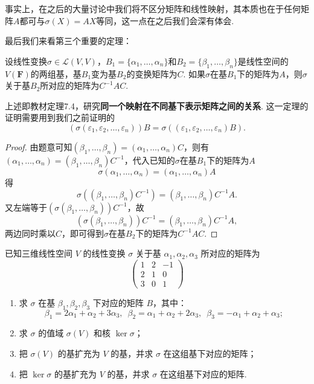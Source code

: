 事实上，在之后的大量讨论中我们将不区分矩阵和线性映射，其本质也在于任何矩阵$A$都可与$\sigma(X)=AX$等同，这一点在之后我们会深有体会.

最后我们来看第三个重要的定理：
\begin{theorem}[基的选择对映射矩阵的影响] \label{thm:11:基的选择对映射矩阵的影响}
    设线性变换$\sigma \in \mathcal{L}(V,V)$，$B_1=\{\alpha_1,\ldots,\alpha_n\}$和$B_2=\{\beta_1,\ldots,\beta_n\}$是线性空间的$V(\mathbf{F})$的两组基，基$B_1$变为基$B_2$的变换矩阵为$C$. 如果$\sigma$在基$B_1$下的矩阵为$A$，则$\sigma$关于基$B_2$所对应的矩阵为$C^{-1}AC$.
\end{theorem}
上述即教材定理7.4，研究\textbf{同一个映射在不同基下表示矩阵之间的关系}. 这一定理的证明需要用到我们之前证明的
\[(\sigma(\varepsilon_1,\varepsilon_2,\ldots,\varepsilon_n))B=\sigma((\varepsilon_1,\varepsilon_2,\ldots,\varepsilon_n)B).\]

\begin{proof}
    由题意可知$(\beta_1,\ldots,\beta_n)=(\alpha_1,\ldots,\alpha_n)C$，则有$(\alpha_1,\ldots,\alpha_n)=(\beta_1,\ldots,\beta_n)C^{-1}$，代入已知的$\sigma$在基$B_1$下的矩阵为$A$
    \[\sigma(\alpha_1,\ldots,\alpha_n)=(\alpha_1,\ldots,\alpha_n)A\]
    得
    \[\sigma((\beta_1,\ldots,\beta_n)C^{-1})=(\beta_1,\ldots,\beta_n)C^{-1}A.\]
    又左端等于$(\sigma(\beta_1,\ldots,\beta_n))C^{-1}$，故
    \[(\sigma(\beta_1,\ldots,\beta_n))C^{-1}=(\beta_1,\ldots,\beta_n)C^{-1}A,\]
    两边同时乘以$C$，即可得到$\sigma$在基$B_2$下的矩阵为$C^{-1}AC$.
\end{proof}

\begin{example}
    已知三维线性空间 $V$ 的线性变换 $\sigma$ 关于基 $\alpha_1,\alpha_2,\alpha_3$ 所对应的矩阵为
    \[\begin{pmatrix}1 & 2 & -1 \\ 2 & 1 & 0 \\ 3 & 0 & 1\end{pmatrix}\]
    \begin{enumerate}
        \item 求 $\sigma$ 在基 $\beta_1,\beta_2,\beta_3$ 下对应的矩阵 $B$，其中：
              \[\beta_1=2\alpha_1+\alpha_2+3\alpha_3,\enspace \beta_2=\alpha_1+\alpha_2+2\alpha_3,\enspace \beta_3=-\alpha_1+\alpha_2+\alpha_3;\]

        \item 求 $\sigma$ 的值域 $\sigma(V)$ 和核 $\ker\sigma$；

        \item 把 $\sigma(V)$ 的基扩充为 $V$ 的基，并求 $\sigma$ 在这组基下对应的矩阵；

        \item 把 $\ker\sigma$ 的基扩充为 $V$ 的基，并求 $\sigma$ 在这组基下对应的矩阵.
    \end{enumerate}
\end{example}

